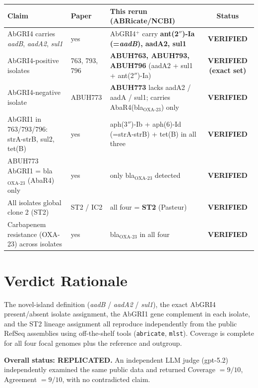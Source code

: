 \documentclass[11pt]{article}
\begin{document}
\begin{center}
\begin{longtable}{@{}p{6.3cm}p{3.3cm}p{4.6cm}c@{}}
\toprule
\textbf{Claim} & \textbf{Paper} & \textbf{This rerun (ABRicate/NCBI)} & \textbf{Status} \\
\midrule\endhead
AbGRI4 carries \emph{aadB}, \emph{aadA2}, \emph{sul1}
  & yes
  & AbGRI4$^+$ carry \textbf{ant(2$''$)-Ia (=\emph{aadB}), aadA2, sul1}
  & \textbf{VERIFIED} \\
AbGRI4-positive isolates
  & 763, 793, 796
  & \textbf{ABUH763, ABUH793, ABUH796} (aadA2 + sul1 + ant(2$''$)-Ia)
  & \textbf{VERIFIED (exact set)} \\
AbGRI4-negative isolate
  & ABUH773
  & \textbf{ABUH773} lacks aadA2 / aadA / sul1; carries AbaR4(bla$_{\text{OXA-23}}$) only
  & \textbf{VERIFIED} \\
AbGRI1 in 763/793/796: strA-strB, sul2, tet(B)
  & yes
  & aph(3$''$)-Ib + aph(6)-Id (=strA-strB) + tet(B) in all three
  & \textbf{VERIFIED} \\
ABUH773 AbGRI1 = bla$_{\text{OXA-23}}$ (AbaR4) only
  & yes
  & only bla$_{\text{OXA-23}}$ detected
  & \textbf{VERIFIED} \\
All isolates global clone 2 (ST2)
  & ST2 / IC2
  & all four = \textbf{ST2} (Pasteur)
  & \textbf{VERIFIED} \\
Carbapenem resistance (OXA-23) across isolates
  & yes
  & bla$_{\text{OXA-23}}$ in all four
  & \textbf{VERIFIED} \\
\bottomrule
\end{longtable}
\end{center}

\section{Verdict Rationale}

The novel-island definition (\emph{aadB} / \emph{aadA2} / \emph{sul1}), the exact AbGRI4 present/absent
isolate assignment, the AbGRI1 gene complement in each isolate, and the ST2 lineage assignment all reproduce
independently from the public RefSeq assemblies using off-the-shelf tools (\texttt{abricate}, \texttt{mlst}).
Coverage is complete for all four focal genomes plus the reference and outgroup.

\textbf{Overall status: REPLICATED.} An independent LLM judge (gpt-5.2) independently examined the same
public data and returned Coverage $= 9/10$, Agreement $= 9/10$, with no contradicted claim.
\end{document}
